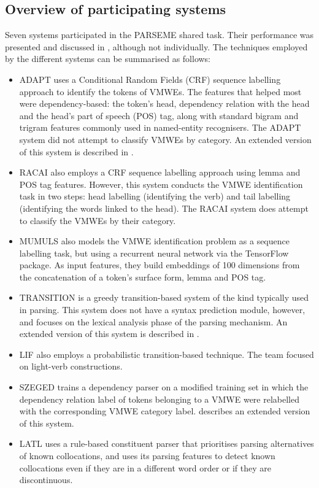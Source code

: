 \documentclass[output=paper
,modfonts
,nonflat,draftmode]{langsci/langscibook}
\begin{document}
\subsection{Overview of participating systems}

Seven systems participated in the PARSEME shared task. Their performance was presented and discussed in , although not individually. The techniques employed by the different systems can be summarised as follows:

\begin{itemize}
    \item ADAPT \citep{maldonado2017} uses a Conditional Random Fields (CRF) sequence labelling approach to identify the tokens of VMWEs. The features that helped most were dependency-based: the token's head, dependency relation with the head and the head's part of speech (POS) tag, along with standard bigram and trigram features commonly used in named-entity recognisers. The ADAPT system did not attempt to classify VMWEs by category. An extended version of this system is described in .
    \item RACAI \citep{borocs2017} also employs a CRF sequence labelling approach using lemma and POS tag features. However, this system conducts the VMWE identification task in two steps: head labelling (identifying the verb) and tail labelling (identifying the words linked to the head). The RACAI system does attempt to classify the VMWEs by their category. 
    \item MUMULS \citep{W17-1707} also models the VMWE identification problem as a sequence labelling task, but using a recurrent neural network via the TensorFlow package. As input features, they build embeddings of 100 dimensions from the concatenation of a token's surface form, lemma and POS tag. 
    \item TRANSITION \citep{W17-1717} is a greedy transition-based system of the kind typically used in parsing. This system does not have a syntax prediction module, however, and focuses on the lexical analysis phase of the parsing mechanism. An extended version of this system is described in .
    \item LIF \citep{MWEWorkshop} also employs a probabilistic transition-based technique. The team focused on  light-verb constructions. 
    \item SZEGED \citep{Simko2017} trains a dependency parser on a modified training set in which the dependency relation label of tokens belonging to a VMWE were relabelled with the corresponding VMWE category label.  describes an extended version of this system.
    \item LATL \citep{W17-1706} uses a rule-based constituent parser that prioritises parsing alternatives of known collocations, and uses its parsing features to detect known collocations even if they are in a different word order or if they are discontinuous.
\end{itemize}
\end{document}
